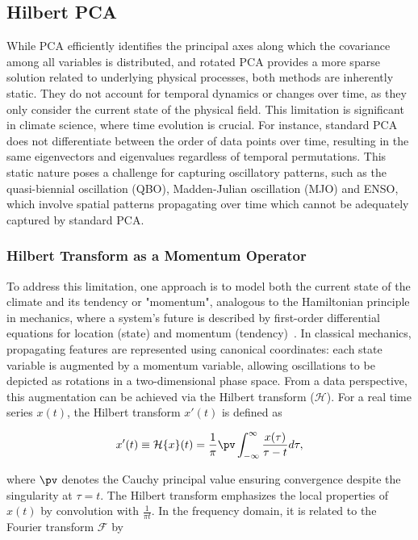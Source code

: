 \subsection{Hilbert PCA}\label{sec:theory:hilbert_pca}
While PCA efficiently identifies the principal axes along which the covariance among all variables is distributed, and rotated PCA provides a more sparse solution related to underlying physical processes, both methods are inherently static. They do not account for temporal dynamics or changes over time, as they only consider the current state of the physical field. This limitation is significant in climate science, where time evolution is crucial. For instance, standard PCA does not differentiate between the order of data points over time, resulting in the same eigenvectors and eigenvalues regardless of temporal permutations. This static nature poses a challenge for capturing oscillatory patterns, such as the quasi-biennial oscillation (QBO), Madden-Julian oscillation (MJO) \cite{madden_detection_1971} and ENSO, which involve spatial patterns propagating over time which cannot be adequately captured by standard PCA.

\subsubsection{Hilbert Transform as a Momentum Operator}

To address this limitation, one approach is to model both the current state of the climate and its tendency or "momentum", analogous to the Hamiltonian principle in mechanics, where a system's future is described by first-order differential equations for location (state) and momentum (tendency)~\cite[cf.][p. 353]{storch_statistical_1999}. In classical mechanics, propagating features are represented using canonical coordinates: each state variable is augmented by a momentum variable, allowing oscillations to be depicted as rotations in a two-dimensional phase space. From a data perspective, this augmentation can be achieved via the Hilbert transform ($\mathcal{H}$). For a real time series $x(t)$, the Hilbert transform $x'(t)$ is defined as

\begin{align}\label{eq:theory:hilbert_transform_time}
x'(t) \equiv \HT{x}(t) = \frac{1}{\pi} \pv \int_{-\infty}^{\infty} \frac{x(\tau)}{\tau - t} d\tau,
\end{align}

where $\pv$ denotes the Cauchy principal value ensuring convergence despite the singularity at $\tau=t$. The Hilbert transform emphasizes the local properties of $x(t)$ by convolution with $\frac{1}{\pi t}$. In the frequency domain, it is related to the Fourier transform $\mathcal{F}$ by

